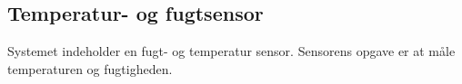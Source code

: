 \subsection{Temperatur- og fugtsensor}

Systemet indeholder  en fugt- og temperatur sensor. Sensorens opgave er at måle temperaturen og fugtigheden.